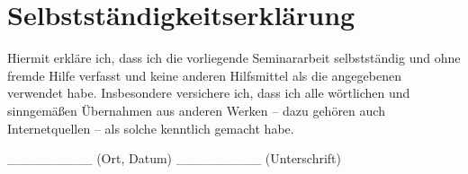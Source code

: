\documentclass[12pt]{article}
\begin{document}
\newpage
\nocite{*}
\printbibliography[heading=bibintoc,title=Literaturverzeichnis,notkeyword={picture}]
\printbibliography[heading=bibintoc,title=Bildverzeichnis,keyword={picture}]

\newpage
\section{Selbstständigkeitserklärung}
	Hiermit erkläre ich, dass ich die vorliegende Seminararbeit selbstständig und ohne fremde Hilfe verfasst und keine anderen Hilfsmittel als die angegebenen verwendet habe.
	Insbesondere versichere ich, dass ich alle wörtlichen und sinngemäßen Übernahmen aus anderen Werken – dazu gehören auch Internetquellen – als solche kenntlich gemacht habe.
	
	\_\_\_\_\_\_\_\_\_
	(Ort, Datum)
	\_\_\_\_\_\_\_\_\_
	(Unterschrift) 
\end{document}

